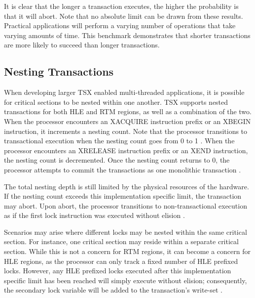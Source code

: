 \documentclass[a4paper]{article}
\begin{document}
\indent It is clear that the longer a transaction executes, the higher the
probability is that it will abort.  Note that no absolute limit can be drawn
from these results.  Practical applications will perform a varying number of
operations that take varying amounts of time.  This benchmark demonstrates that
shorter transactions are more likely to succeed than longer transactions.\par

\subsection{\textbf{Nesting Transactions}}

\indent When developing larger TSX enabled multi-threaded applications, it is
possible for critical sections to be nested within one another.  TSX supports
nested transactions for both HLE and RTM regions, as well as a combination of
the two.  When the processor encounters an XACQUIRE instruction prefix or an 
XBEGIN instruction, it increments a nesting count.  Note that the processor
transitions to transactional execution when the nesting count goes from 0 to 1
\cite{intel_prog_ref}.  When the processor encounters an XRELEASE instruction
prefix or an XEND instruction, the nesting count is decremented.  Once the
nesting count returns to 0, the processor attempts to commit the transactions as
one monolithic transaction \cite{intel_prog_ref}.\par

\indent The total nesting depth is still limited by the physical resources of
the hardware.  If the nesting count exceeds this implementation specific limit,
the transaction may abort.  Upon abort, the processor transitions to
non-transactional execution as if the first lock instruction was executed
without elision \cite{intel_prog_ref}.\par

\indent Scenarios may arise where different locks may be nested within the same
critical section.  For instance, one critical section may reside within a
separate critical section.  While this is not a concern for RTM regions, it can
become a concern for HLE regions, as the processor can only track a fixed number
of HLE prefixed locks.  However, any HLE prefixed locks executed after this
implementation specific limit has been reached will simply execute without
elision; consequently, the secondary lock variable will be added to the
transaction's write-set \cite{intel_prog_ref}.

\newpage
\end{document}
